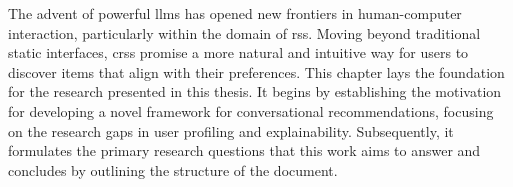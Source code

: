 The advent of powerful \aclp{llm} has opened new frontiers in human-computer interaction, particularly within the domain of \aclp{rs}. Moving beyond traditional static interfaces, \acp{crs} promise a more natural and intuitive way for users to discover items that align with their preferences. This chapter lays the foundation for the research presented in this thesis. It begins by establishing the motivation for developing a novel framework for conversational recommendations, focusing on the research gaps in user profiling and explainability. Subsequently, it formulates the primary research questions that this work aims to answer and concludes by outlining the structure of the document.